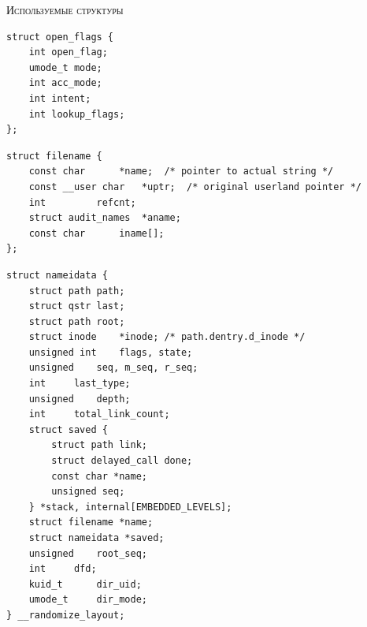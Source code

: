 \textsc{\huge Используемые структуры}
\begin{lstlisting}[caption={\text{Структура open\_flags}}]
struct open_flags {
	int open_flag;
	umode_t mode;
	int acc_mode;
	int intent;
	int lookup_flags;
};
\end{lstlisting}

\begin{lstlisting}[caption={\text{Структура filename}}]
struct filename {
	const char		*name;	/* pointer to actual string */
	const __user char	*uptr;	/* original userland pointer */
	int			refcnt;
	struct audit_names	*aname;
	const char		iname[];
};	
\end{lstlisting}

\begin{lstlisting}[caption={\text{Структура nameidata}}]
struct nameidata {
	struct path	path;
	struct qstr	last;
	struct path	root;
	struct inode	*inode; /* path.dentry.d_inode */
	unsigned int	flags, state;
	unsigned	seq, m_seq, r_seq;
	int		last_type;
	unsigned	depth;
	int		total_link_count;
	struct saved {
		struct path link;
		struct delayed_call done;
		const char *name;
		unsigned seq;
	} *stack, internal[EMBEDDED_LEVELS];
	struct filename	*name;
	struct nameidata *saved;
	unsigned	root_seq;
	int		dfd;
	kuid_t		dir_uid;
	umode_t		dir_mode;
} __randomize_layout;	
\end{lstlisting}

